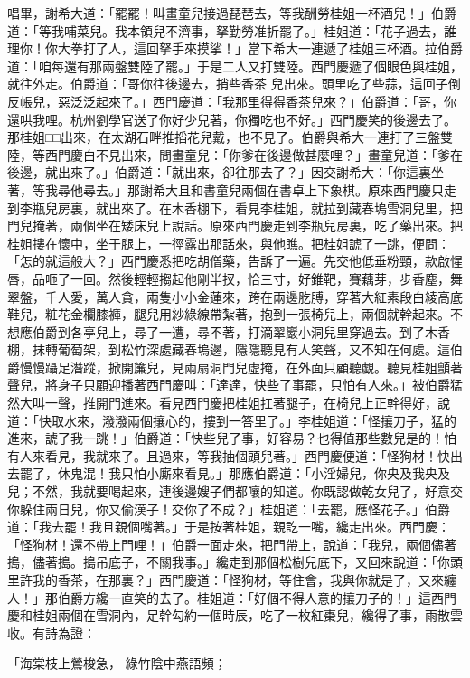 \begin{showcontents}{}
唱畢，謝希大道：「罷罷！叫畫童兒接過琵琶去，等我酬勞桂姐一杯酒兒！」伯爵道：「等我哺菜兒。我本領兒不濟事，拏勤勞准折罷了。」桂姐道：「花子過去，誰理你！你大拳打了人，這回拏手來摸挲！」當下希大一連遞了桂姐三杯酒。拉伯爵道：「咱每還有那兩盤雙陸了罷。」于是二人又打雙陸。西門慶遞了個眼色與桂姐，就往外走。伯爵道：「哥你往後邊去，捎些香茶 兒出來。頭里吃了些蒜，這回子倒反帳兒，惡泛泛起來了。」西門慶道：「我那里得得香茶兒來？」伯爵道：「哥，你還哄我哩。杭州劉學官送了你好少兒著，你獨吃也不好。」西門慶笑的後邊去了。那桂姐□□出來，在太湖石畔推搯花兒戴，也不見了。伯爵與希大一連打了三盤雙陸，等西門慶白不見出來，問畫童兒：「你爹在後邊做甚麼哩？」畫童兒道：「爹在後邊，就出來了。」伯爵道：「就出來，卻往那去了？」因交謝希大：「你這裏坐著，等我尋他尋去。」那謝希大且和書童兒兩個在書卓上下象棋。原來西門慶只走到李瓶兒房裏，就出來了。在木香棚下，看見李桂姐，就拉到藏春塢雪洞兒里，把門兒掩著，兩個坐在矮床兒上說話。原來西門慶走到李瓶兒房裏，吃了藥出來。把桂姐摟在懷中，坐于腿上，一徑露出那話來，與他瞧。把桂姐諕了一跳，便問：「怎的就這般大？」西門慶悉把吃胡僧藥，告訴了一遍。先交他低垂粉頸，款啟惺唇，品咂了一回。然後輕輕搊起他剛半扠，恰三寸，好錐靶，賽藕芽，步香塵，舞翠盤，千人愛，萬人貪，兩隻小小金蓮來，跨在兩邊肐膊，穿著大紅素段白綾高底鞋兒，粧花金欄膝褲，腿兒用紗綠線帶紮著，抱到一張椅兒上，兩個就幹起來。不想應伯爵到各亭兒上，尋了一遭，尋不著，打滴翠巖小洞兒里穿過去。到了木香棚，抹轉葡萄架，到松竹深處藏春塢邊，隱隱聽見有人笑聲，又不知在何處。這伯爵慢慢躡足潛蹤，掀開簾兒，見兩扇洞門兒虛掩，在外面只顧聽覷。聽見桂姐顫著聲兒，將身子只顧迎播著西門慶叫：「達達，快些了事罷，只怕有人來。」被伯爵猛然大叫一聲，推開門進來。看見西門慶把桂姐扛著腿子，在椅兒上正幹得好，說道：「快取水來，潑潑兩個攘心的，摟到一答里了。」李桂姐道：「怪攘刀子，猛的進來，諕了我一跳！」伯爵道：「快些兒了事，好容易？也得值那些數兒是的！怕有人來看見，我就來了。且過來，等我抽個頭兒著。」西門慶便道：「怪狗材！快出去罷了，休鬼混！我只怕小廝來看見。」那應伯爵道：「小淫婦兒，你央及我央及兒；不然，我就要喝起來，連後邊嫂子們都嚷的知道。你既認做乾女兒了，好意交你躲住兩日兒，你又偷漢子！交你了不成？」桂姐道：「去罷，應怪花子。」伯爵道：「我去罷！我且親個嘴著。」于是按著桂姐，親訖一嘴，纔走出來。西門慶：「怪狗材！還不帶上門哩！」伯爵一面走來，把門帶上，說道：「我兒，兩個儘著搗，儘著搗。搗吊底子，不關我事。」纔走到那個松樹兒底下，又回來說道：「你頭里許我的香茶，在那裏？」西門慶道：「怪狗材，等住會，我與你就是了，又來纏人！」那伯爵方纔一直笑的去了。桂姐道：「好個不得人意的攘刀子的！」這西門慶和桂姐兩個在雪洞內，足幹勾約一個時辰，吃了一枚紅棗兒，纔得了事，雨散雲收。有詩為證：

「海棠枝上鶯梭急，  綠竹陰中燕語頻；


\end{showcontents}

